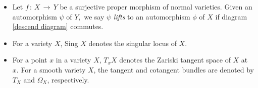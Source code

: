 \documentclass[12pt,reqno]{amsart}
\theoremstyle{definition}
\numberwithin{equation}{section}
\begin{document}
\begin{itemize}
   In fact, one can directly show that if $\phi$ descends to a morphism $\psi\,:\,Y\,\to\, Y$, then $\psi$ is necessarily an automorphism of $Y$, but we will not need this fact.
  \item  Let $f\,:\,X\,\to\, Y$ be a surjective  proper morphism of normal varieties. Given an automorphism $\psi$ of $Y,$ we say $\psi$ \textit{lifts} to an automorphism $\phi$ of $X$ if diagram \ref{descend diagram} commutes.
  
  
  \item For a variety $X$, Sing $X$ denotes the singular locus of $X.$
  \item For a point $x$ in a variety $X$, $T_x X$ denotes the Zariski tangent space of $X$ at $x.$ For a smooth variety $X$, the tangent and cotangent bundles are denoted by $T_X$ and $\Omega_X$, respectively.


\end{itemize}
\end{document}
